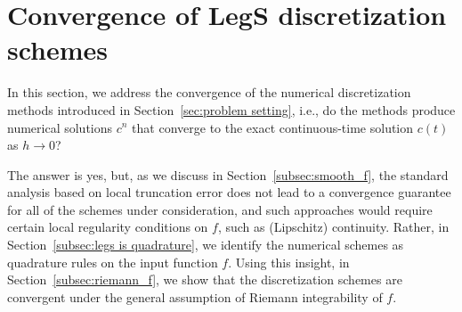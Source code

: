 \documentclass{article}
\theoremstyle{definition}
\begin{document}








\section{Convergence of LegS discretization schemes} \label{sec:error_analysis}



In this section, we address the convergence of the numerical discretization methods introduced in Section~\ref{sec:problem setting}, i.e., do the methods produce numerical solutions $c^n$ that converge to the exact continuous-time solution $c(t)$ as $h\rightarrow 0$?

The answer is yes, but, as we discuss in Section~\ref{subsec:smooth_f}, the standard analysis based on local truncation error does not lead to a convergence guarantee for all of the schemes under consideration, and such approaches would require certain local regularity conditions on $f$, such as (Lipschitz) continuity. Rather, in Section~\ref{subsec:legs is quadrature}, we identify the numerical schemes as quadrature rules on the input function $f$. Using this insight, in Section~\ref{subsec:riemann_f}, we show that the discretization schemes are convergent under the general assumption of Riemann integrability of $f$.
\end{document}
